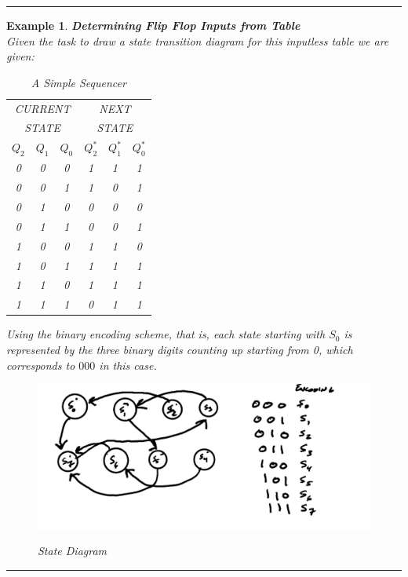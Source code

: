 \documentclass[12pt]{article}
\newtheorem{example}{Example}
\newenvironment{examp}
{
	\vspace{.5cm}
	\hrule
\begin{example}\upshape}
	{\hrule
		\vspace{0.5cm}
\end{example}}
\begin{document}
\begin{examp}
\vspace{.5mm}
\textbf{Determining Flip Flop Inputs from Table}\\
Given the task to draw a state transition diagram for this inputless table we
are given:
\begin{table}[H]
	\centering
	\begin{tabular}{|c|c|c|c|c|c|}
		\hline
		\multicolumn{3}{|c|}{CURRENT} & \multicolumn{3}{c|}{NEXT}                                                \\
		\multicolumn{3}{|c|}{STATE}   & \multicolumn{3}{c|}{STATE}                                               \\
		\hline
		\(Q_2\)                       & \(Q_1\)                    & \(Q_0\) & \(Q_2^*\) & \(Q_1^*\) & \(Q_0^*\) \\
		\hline
		0                             & 0                          & 0       & 1         & 1         & 1         \\
		0                             & 0                          & 1       & 1         & 0         & 1         \\
		0                             & 1                          & 0       & 0         & 0         & 0         \\
		0                             & 1                          & 1       & 0         & 0         & 1         \\
		1                             & 0                          & 0       & 1         & 1         & 0         \\
		1                             & 0                          & 1       & 1         & 1         & 1         \\
		1                             & 1                          & 0       & 1         & 1         & 1         \\
		1                             & 1                          & 1       & 0         & 1         & 1         \\
		\hline
	\end{tabular}
	\caption{A Simple Sequencer}
\end{table}
Using the binary encoding scheme, that is, each state starting with \(S_0\) is
represented by the three binary digits counting up starting from 0, which
corresponds to \(000\) in this case.
\begin{figure}
	{\includegraphics[scale=.6]{examp103}}
	\caption{State Diagram}
\end{figure}


\end{examp}
\end{document}

